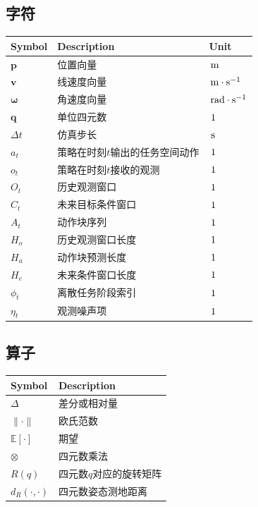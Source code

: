 \subsection*{字符}
\begin{center}
\small
\renewcommand{\arraystretch}{1.15}
\begin{tabular}{>{\centering\arraybackslash}p{}p{}>{\centering\arraybackslash}p{}}
\hline
\textbf{Symbol} & \textbf{Description} & \textbf{Unit} \\
\hline
$\mathbf{p}$ & 位置向量 & $\,\mathrm{m}$ \\
$\mathbf{v}$ & 线速度向量 & $\,\mathrm{m \cdot s^{-1}}$ \\
$\boldsymbol{\omega}$ & 角速度向量 & $\,\mathrm{rad \cdot s^{-1}}$ \\
$\mathbf{q}$ & 单位四元数 & $\,\mathrm{1}$ \\
$\Delta t$ & 仿真步长 & $\,\mathrm{s}$ \\
$a_t$ & 策略在时刻$t$输出的任务空间动作 & $\,\mathrm{1}$ \\
$o_t$ & 策略在时刻$t$接收的观测 & $\,\mathrm{1}$ \\
$O_t$ & 历史观测窗口 & $\,\mathrm{1}$ \\
$C_t$ & 未来目标条件窗口 & $\,\mathrm{1}$ \\
$A_t$ & 动作块序列 & $\,\mathrm{1}$ \\
$H_o$ & 历史观测窗口长度 & $\,\mathrm{1}$ \\
$H_a$ & 动作块预测长度 & $\,\mathrm{1}$ \\
$H_c$ & 未来条件窗口长度 & $\,\mathrm{1}$ \\
$\phi_t$ & 离散任务阶段索引 & $\,\mathrm{1}$ \\
$\eta_t$ & 观测噪声项 & $\,\mathrm{1}$ \\
\hline
\end{tabular}
\end{center}

\subsection*{算子}
\begin{center}
\small
\renewcommand{\arraystretch}{1.15}
\begin{tabular}{>{\centering\arraybackslash}p{}p{}}
\hline
\textbf{Symbol} & \textbf{Description} \\
\hline
$\Delta$ & 差分或相对量 \\
$\|\cdot\|$ & 欧氏范数 \\
$\mathbb{E}[\cdot]$ & 期望 \\
$\otimes$ & 四元数乘法 \\
$R(q)$ & 四元数$q$对应的旋转矩阵 \\
$d_R(\cdot,\cdot)$ & 四元数姿态测地距离 \\
\hline
\end{tabular}
\end{center}

